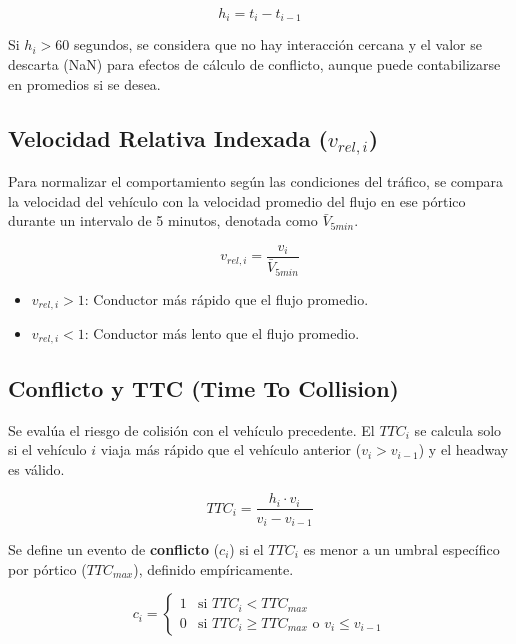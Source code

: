 \begin{equation}
    h_i = t_i - t_{i-1}
\end{equation}

Si $h_i > 60$ segundos, se considera que no hay interacción cercana y el valor se descarta (NaN) para efectos de cálculo de conflicto, aunque puede contabilizarse en promedios si se desea.

\subsection{Velocidad Relativa Indexada ($v_{rel, i}$)}
Para normalizar el comportamiento según las condiciones del tráfico, se compara la velocidad del vehículo con la velocidad promedio del flujo en ese pórtico durante un intervalo de 5 minutos, denotada como $\bar{V}_{5min}$.

\begin{equation}
    v_{rel, i} = \frac{v_i}{\bar{V}_{5min}}
\end{equation}

\begin{itemize}
    \item $v_{rel, i} > 1$: Conductor más rápido que el flujo promedio.
    \item $v_{rel, i} < 1$: Conductor más lento que el flujo promedio.
\end{itemize}

\subsection{Conflicto y TTC (Time To Collision)}
Se evalúa el riesgo de colisión con el vehículo precedente. El $TTC_i$ se calcula solo si el vehículo $i$ viaja más rápido que el vehículo anterior ($v_i > v_{i-1}$) y el headway es válido.

\begin{equation}
    TTC_i = \frac{h_i \cdot v_i}{v_i - v_{i-1}}
\end{equation}

Se define un evento de \textbf{conflicto} ($c_i$) si el $TTC_i$ es menor a un umbral específico por pórtico ($TTC_{max}$), definido empíricamente.

\begin{equation}
    c_i = \begin{cases} 
    1 & \text{si } TTC_i < TTC_{max} \\
    0 & \text{si } TTC_i \ge TTC_{max} \text{ o } v_i \le v_{i-1}
    \end{cases}
\end{equation}

